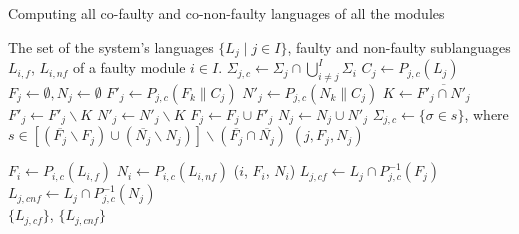\documentclass[a4paper, 10pt, conference]{ieeeconf}
\begin{document}
\begin{algorithm}
\caption{Computing all co-faulty and co-non-faulty languages of
all the modules}
\begin{algorithmic}[1]
	\Require The set of the system's languages $\{L_j\mid j \in I\}$, faulty and
	non-faulty sublanguages $L_{i,f}$, $L_{i,nf}$ of a faulty module $i\in I$.
	\label{alg:fcf_init}
		\State $\Sigma_{j,c} \leftarrow \Sigma_j \cap \bigcup_{i\neq j}^I\Sigma_i$
		\State $C_j \leftarrow P_{j,c}(L_j)$
		\State $F_j \leftarrow \emptyset, N_j \leftarrow \emptyset$
	\EndFor
			\State $F'_j \leftarrow P_{j,c}(F_k \parallel C_j)$
			\label{alg:fcf_partial_begin}
			\State $N'_j \leftarrow P_{j,c}(N_k \parallel C_j)$ 
			\State $K \leftarrow \overline{F'_j \cap N'_j}$
			\State $F'_j \leftarrow F'_j \backslash K$
			\State $N'_j \leftarrow N'_j \backslash K$
			\label{alg:fcf_partial_end}
				\label{alg:fcf_update}
				\State $F_j \leftarrow F_j \cup F'_j$
				\State $N_j \leftarrow N_j \cup N'_j$
				\State $\Sigma_{j,c} \leftarrow
					\{\sigma \in s \}$, where
				\State $s \in
						\left[(\overline{F_j} \backslash F_j) \cup
						(\overline{N_j} \backslash N_j)\right] \backslash	
						(\overline{F_j} \cap \overline{N_j})
						$
				\State {}$(j, F_j, N_j)$
			\EndIf
		\EndFor
	\EndProcedure
	
	\State $F_i \leftarrow P_{i,c}(L_{i,f})$
		\label{alg:fcf_Fi}
	\State $N_i \leftarrow P_{i,c}(L_{i,nf})$
	\State {}($i$, $F_i$, $N_i$)
		\label{alg:fcf_final}
		\State $L_{j,cf} \leftarrow L_j \cap P_{j,c}^{-1}(F_j)$
		\State $L_{j,cnf} \leftarrow L_j \cap P_{j,c}^{-1}(N_j)$
	\EndFor
	\\
	\Return $\{L_{j,cf}\}$, $\{L_{j,cnf}\}$
\end{algorithmic}
\label{alg:propagate_fn}
\end{algorithm}
\end{document}
